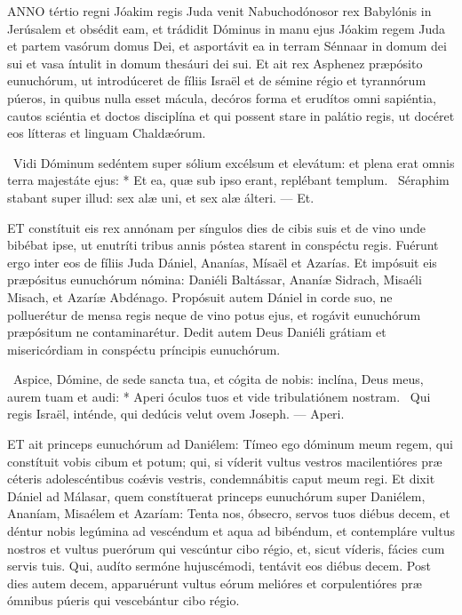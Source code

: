 



\lettrine[lines=2]{A}{NNO} tértio regni Jóakim regis Juda venit Nabuchodónosor rex Babylónis in Jerúsalem et obsédit eam, et trádidit Dóminus in manu ejus Jóakim regem Juda et partem vasórum domus Dei, et asportávit ea in terram Sénnaar in domum dei sui et vasa íntulit in domum thesáuri dei sui. Et ait rex Asphenez præpósito eunuchórum, ut introdúceret de fíliis Israël et de sémine régio et tyrannórum púeros, in quibus nulla esset mácula, decóros forma et erudítos omni sapiéntia, cautos sciéntia et doctos disciplína et qui possent stare in palátio regis, ut docéret eos lítteras et linguam Chaldæórum.

\R\ Vidi Dóminum sedéntem super sólium excélsum et elevátum: et plena erat omnis terra majestáte ejus: * Et ea, quæ sub ipso erant, replébant templum. \V\ Séraphim stabant super illud: sex alæ uni, et sex alæ álteri. — Et.


\lettrine[lines=2]{E}{T} constítuit eis rex annónam per síngulos dies de cibis suis et de vino unde bibébat ipse, ut enutríti tribus annis póstea starent in conspéctu regis. Fuérunt ergo inter eos de fíliis Juda Dániel, Ananías, Mísaël et Azarías. Et impósuit eis præpósitus eunuchórum nómina: Daniéli Baltássar, Ananíæ Sidrach, Misaéli Misach, et Azaríæ Abdénago. Propósuit autem Dániel in corde suo, ne polluerétur de mensa regis neque de vino potus ejus, et rogávit eunuchórum præpósitum ne contaminarétur. Dedit autem Deus Daniéli grátiam et misericórdiam in conspéctu príncipis eunuchórum.

\R\ Aspice, Dómine, de sede sancta tua, et cógita de nobis: inclína, Deus meus, aurem tuam et audi: * Aperi óculos tuos et vide tribulatiónem nostram. \V\ Qui regis Israël, inténde, qui dedúcis velut ovem Joseph. — Aperi.


\lettrine[lines=2]{E}{T} ait princeps eunuchórum ad Daniélem: Tímeo ego dóminum meum regem, qui constítuit vobis cibum et potum; qui, si víderit vultus vestros macilentióres præ céteris adolescéntibus coǽvis vestris, condemnábitis caput meum regi. Et dixit Dániel ad Málasar, quem constítuerat princeps eunuchórum super Daniélem, Ananíam, Misaélem et Azaríam: Tenta nos, óbsecro, servos tuos diébus decem, et déntur nobis legúmina ad vescéndum et aqua ad bibéndum, et contempláre vultus nostros et vultus puerórum qui vescúntur cibo régio, et, sicut víderis, fácies cum servis tuis. Qui, audíto sermóne hujuscémodi, tentávit eos diébus decem. Post dies autem decem, apparuérunt vultus eórum melióres et corpulentióres præ ómnibus púeris qui vescebántur cibo régio.

